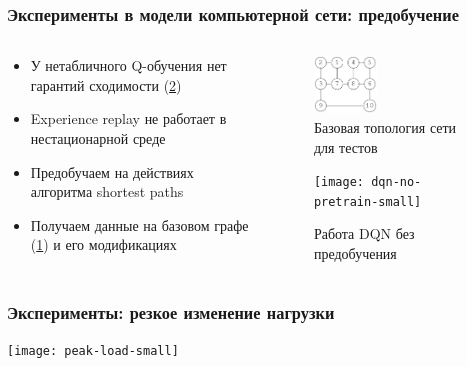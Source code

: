\documentclass{beamer}
\begin{document}
\begin{frame}
  \frametitle{Эксперименты в модели компьютерной сети: предобучение}
  \begin{columns}
    \begin{column}{0.5\textwidth}
      \begin{itemize}
      \item У нетабличного Q-обучения нет гарантий сходимости (\ref{fig:dqn-no-pretrain})
      \item Experience replay не работает в нестационарной среде
      \item Предобучаем на действиях алгоритма shortest paths
      \item Получаем данные на базовом графе (\ref{fig:network-small}) и его модификациях
      \end{itemize}
    \end{column}
    \begin{column}{0.5\textwidth}
      \begin{center}
        \begin{figure}[!h]
          \caption{Базовая топология сети для тестов}\label{fig:network-small}
          \centerline{\includegraphics[width=0.4\textwidth]{graph-2-1.png}}
        \end{figure}        
        \vspace{-0.4in}
        \begin{figure}[!h]
          \caption{Работа DQN без предобучения}\label{fig:dqn-no-pretrain}
          \centerline{\texttt{[image: dqn-no-pretrain-small]}}
        \end{figure}
      \end{center}
    \end{column}
  \end{columns}
\end{frame}



\begin{frame}
  \frametitle{Эксперименты: резкое изменение нагрузки}
  \texttt{[image: peak-load-small]} 
\end{frame}
\end{document}
